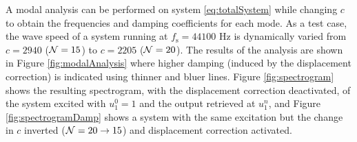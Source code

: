 A modal analysis can be performed on system \eqref{eq:totalSystem} while changing $c$ to obtain the frequencies and damping coefficients for each mode. As a test case, the wave speed of a system running at $f_\text{s} = 44100$ Hz is dynamically varied from $c = 2940$ ($\mathcal{N} = 15$) to $c = 2205$ ($\mathcal{N} = 20$). %
The results of the analysis are shown in Figure \ref{fig:modalAnalysis} where higher damping (induced by the displacement correction) is indicated using thinner and bluer lines. Figure \ref{fig:spectrogram} shows the resulting spectrogram, with the displacement correction deactivated, of the system excited with $u_1^0 = 1$ and the output retrieved at $u_1^n$, and Figure \ref{fig:spectrogramDamp} shows a system with the same excitation but the change in $c$ inverted ($\mathcal{N}=20\rightarrow 15$) and displacement correction activated.

